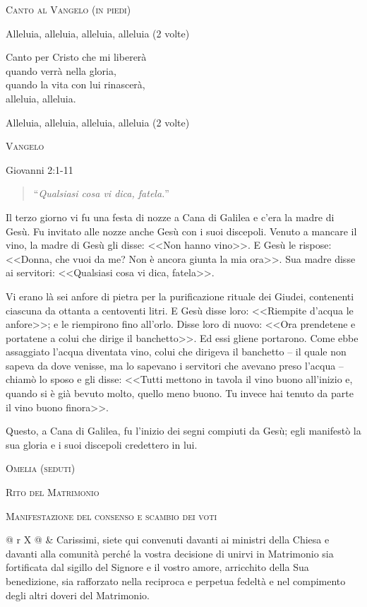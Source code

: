 \documentclass[12pt,twoside]{article}
\makeatletter
\newcommand{\htwo}[1]{{\Large\scshape #1}}
\newcommand{\masspart}[1]{\bigskip

  \htwo{#1}}
\newcommand{\masssubpart}[1]{\bigskip

  {\large\scshape #1}}
\newcommand{\sayline}[2]{
  \begin{tabularx}{\textwidth}{@{} r X @{}}
    \makebox[6.0em][r]{\ifx&#1& #1 \else \textit{#1:} \fi} & #2
\end{tabularx}}
\newcommand{\reading}[1]{#1}
\newcommand{\readingquote}[1]{
\begin{quote}
``\textit{#1}''
\end{quote}
}
\makeatother
\begin{document}
\masssubpart{Canto al Vangelo (in piedi)}

Alleluia, alleluia, alleluia, alleluia (2 volte)

Canto per Cristo che mi libererà\\
quando verrà nella gloria,\\
quando la vita con lui rinascerà,\\
alleluia, alleluia.

Alleluia, alleluia, alleluia, alleluia (2 volte)

\newpage

\masssubpart{Vangelo}

\reading{Giovanni 2:1-11}
\readingquote{Qualsiasi cosa vi dica, fatela.}

Il terzo giorno vi fu una festa di nozze a Cana di Galilea e c'era la madre di Gesù. Fu invitato alle nozze anche Gesù con i suoi discepoli. Venuto a mancare il vino, la madre di Gesù gli disse: <<Non hanno vino>>. E Gesù le rispose: <<Donna, che vuoi da me? Non è ancora giunta la mia ora>>. Sua madre disse ai servitori: <<Qualsiasi cosa vi dica, fatela>>.

Vi erano là sei anfore di pietra per la purificazione rituale dei Giudei, contenenti ciascuna da ottanta a centoventi litri. E Gesù disse loro: <<Riempite d'acqua le anfore>>; e le riempirono fino all'orlo. Disse loro di nuovo: <<Ora prendetene e portatene a colui che dirige il banchetto>>. Ed essi gliene portarono. Come ebbe assaggiato l'acqua diventata vino, colui che dirigeva il banchetto -- il quale non sapeva da dove venisse, ma lo sapevano i servitori che avevano preso l'acqua -- chiamò lo sposo e gli disse: <<Tutti mettono in tavola il vino buono all'inizio e, quando si è già bevuto molto, quello meno buono. Tu invece hai tenuto da parte il vino buono finora>>.

Questo, a Cana di Galilea, fu l'inizio dei segni compiuti da Gesù; egli manifestò la sua gloria e i suoi discepoli credettero in lui.


\masssubpart{Omelia (seduti)}

\newpage

\masspart{Rito del Matrimonio}

\masssubpart{Manifestazione del consenso e scambio dei voti}

\sayline{Celebrante}{Carissimi, siete qui convenuti davanti ai ministri della Chiesa e davanti alla comunità perché la vostra decisione di unirvi in Matrimonio sia fortificata dal sigillo del Signore e il vostro amore, arricchito della Sua benedizione, sia rafforzato nella reciproca e perpetua fedeltà e nel compimento degli altri doveri del Matrimonio.}
\end{document}
